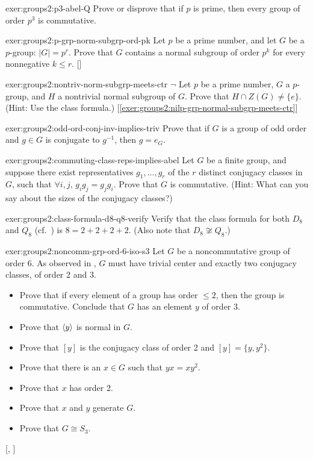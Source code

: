 \begin{exer}{}{exer:groups2:p3-abel-Q}
  Prove or disprove that if $p$ is prime, then every group of order
  $p^3$ is commutative.
\end{exer}
\begin{exer}{}{exer:groups2:p-grp-norm-subgrp-ord-pk}
  \exerused{} Let $p$ be a prime number, and let $G$ be a $p$-group:
  $|G| = p^r$.  Prove that $G$ contains a normal subgroup of order
  $p^k$ for every nonnegative $k \leq r$. []
\end{exer}
\begin{exer}{}{exer:groups2:nontriv-norm-subgrp-meets-ctr}
  $\lnot$ Let $p$ be a prime number, $G$ a $p$-group, and $H$ a
  nontrivial normal subgroup of $G$. Prove that
  $H \cap Z(G) \neq \{e\}$. (Hint: Use the class formula.)
  [\ref{exer:groups2:nilp-grp-normal-subgrp-meets-ctr}]
\end{exer}
\begin{exer}{}{exer:groups2:odd-ord-conj-inv-implies-triv}
  Prove that if $G$ is a group of odd order and $g \in G$ is conjugate
  to $g^{-1}$, then $g = e_G$.
\end{exer}
\begin{exer}{}{exer:groups2:commuting-class-reps-implies-abel}
  Let $G$ be a finite group, and suppose there exist representatives
  $g_1, \dots, g_r$ of the $r$ distinct conjugacy classes in $G$, such
  that $\forall i, j$, $g_i g_j = g_j g_i$. Prove that $G$ is
  commutative. (Hint: What can you say about the sizes of the
  conjugacy classes?)
\end{exer}
\begin{exer}{}{exer:groups2:class-formula-d8-q8-verify}
  Verify that the class formula for both $D_8$ and $Q_8$ (cf.\
  ) is $8 = 2 + 2 + 2 + 2$. (Also note
  that $D_8 \not\cong Q_8$.)
\end{exer}
\begin{exer}{}{exer:groups2:noncomm-grp-ord-6-iso-s3}
  \exerused{} Let $G$ be a noncommutative group of order 6. As
  observed in , $G$ must have
  trivial center and exactly two conjugacy classes, of order 2 and 3.
  \begin{itemize}
  \item Prove that if every element of a group has order $\leq 2$,
    then the group is commutative. Conclude that $G$ has an element
    $y$ of order 3.
  \item Prove that $\langle y\rangle$ is normal in $G$.
  \item Prove that $[y]$ is the conjugacy class of order 2 and
    $[y] = \{y, y^2\}$.
  \item Prove that there is an $x \in G$ such that $yx = xy^2$.
  \item Prove that $x$ has order 2.
  \item Prove that $x$ and $y$ generate $G$.
  \item Prove that $G \cong S_3$.
  \end{itemize} [, ]
\end{exer}
